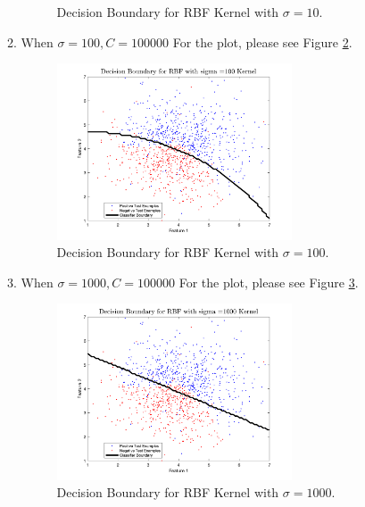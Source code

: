 \documentclass[english]{article}
\begin{document}
\begin{enumerate}
\begin{enumerate}
\begin{figure}[H]
          \caption{Decision Boundary for RBF Kernel with $\sigma = 10$.}
          \label{fig:10}
        \end{figure}
\item When $\boxed{\sigma = 100, C = 100000}$ For the plot, please see Figure \ref{fig:100}.\\
        \begin{figure}[H]
          \centering
          \includegraphics[width=0.7\textwidth]{100.png}
          \caption{Decision Boundary for RBF Kernel with $\sigma = 100$.}
          \label{fig:100}
        \end{figure}
        \clearpage
\item When $\boxed{\sigma = 1000, C = 100000}$ For the plot, please see Figure \ref{fig:1000}.\\
        \begin{figure}[H]
          \centering
          \includegraphics[width=0.7\textwidth]{1000.png}
          \caption{Decision Boundary for RBF Kernel with $\sigma = 1000$.}
          \label{fig:1000}
        \end{figure}


\end{enumerate}
\end{enumerate}
\end{document}
